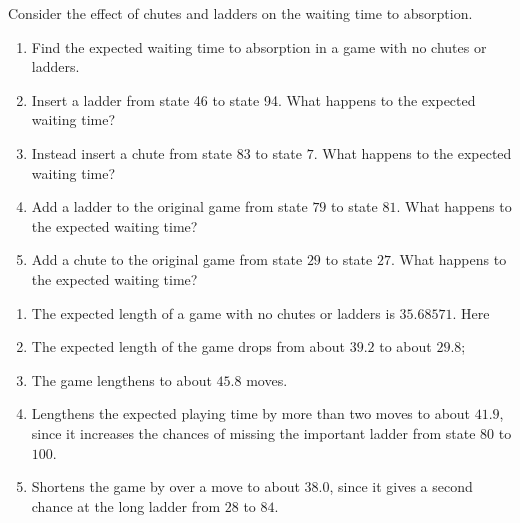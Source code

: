 \documentclass[12pt]{article}
\begin{document}
\begin{exercise}
    Consider the effect of chutes and ladders on the waiting time to
    absorption.
    \begin{enumerate}[label=(\alph*)]
    \item
        Find the expected waiting time to absorption in a game with no
        chutes or ladders.
    \item
        Insert a ladder from state 46 to state 94.  What happens to the
        expected waiting time?
    \item
        Instead insert a chute from state 83 to state \( 7 \).  What
        happens to the expected waiting time?
    \item
        Add a ladder to the original game from state \( 79 \) to state \(
        81 \).  What happens to the expected waiting time?
    \item
        Add a chute to the original game from state \( 29 \) to state \(
        27 \).  What happens to the expected waiting time?
\end{enumerate}
\end{exercise}
\begin{solution}
    \begin{enumerate}[label=(\alph*)]
    \item
        The expected length of a game with no chutes or ladders is \(
        35.68571 \).  Here
    \item
        The expected length of the game drops from about \( 39.2 \) to
        about \( 29.8 \);
    \item
        The game lengthens to about \( 45.8 \) moves.
    \item
        Lengthens the expected playing time by more than two moves to
        about \( 41.9 \), since it increases the chances of missing the
        important ladder from state \( 80 \) to \( 100 \).
    \item
        Shortens the game by over a move to about \( 38.0 \), since it
        gives a second chance at the long ladder from \( 28 \) to \( 84 \).
\end{enumerate}
\end{solution}
\end{document}
